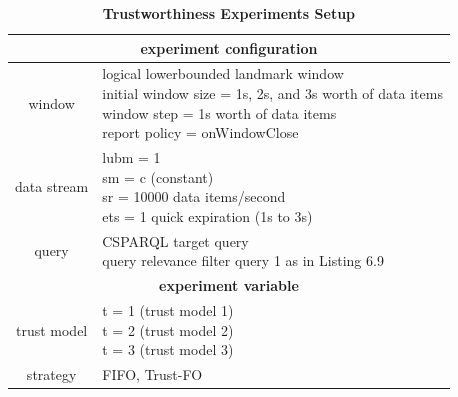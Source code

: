 \begin{table}[!htbp]
	\centering
    \caption{\textbf{Trustworthiness Experiments Setup}}
    \label{tab:6-tes}
    \begin{tabular}{|c|l|} \hline
    \multicolumn{2}{|c|}{\textbf{experiment configuration}} \\ \hline
    window & \makecell[l]{logical lowerbounded landmark window \\ initial window size = 1s, 2s, and 3s worth of data items \\ window step = 1s worth of data items \\ report policy = onWindowClose} \\ \hline
    data stream & \makecell[l]{lubm = 1 \\ sm = c (constant) \\ sr = 10000 data items/second \\ ets = 1 quick expiration (1s to 3s)} \\ \hline
    query & \makecell[l]{CSPARQL target query \\ query relevance filter query 1 as in Listing 6.9} \\ \hline
    \multicolumn{2}{|c|}{\textbf{experiment variable}} \\ \hline
    trust model & \makecell[l]{t = 1 (trust model 1) \\ t = 2 (trust model 2) \\ t = 3 (trust model 3)} \\ \hline
    strategy & FIFO, Trust-FO  \\ \hline
    \end{tabular}
\end{table}

